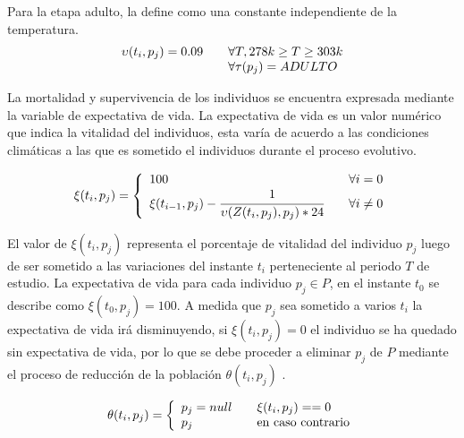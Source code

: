 Para la etapa adulto, \cite{otero2006stochastic} la define como una constante independiente de la temperatura.
\begin{equation}
 \begin{array}{l l}
    \upsilon(t_{i}, p_{j}) = 0.09 &\quad  \forall T, 278 k \geq T \geq 303 k\\
              & \quad \forall \tau(p_{j}) = ADULTO
\end{array}
\end{equation}

La mortalidad y supervivencia de los individuos se encuentra expresada mediante la variable de expectativa de
vida. La expectativa de vida es un valor numérico que indica la vitalidad del individuos, esta varía de acuerdo
a las condiciones climáticas a las que es sometido el individuos durante el proceso evolutivo.

\begin{equation}
\xi (t_{i}, p_{j}) = \left\{
  \begin{array}{l l}
    100 & \quad \forall i = 0 \\
    \xi (t_{i-1}, p_{j}) - \cfrac{1}{\upsilon(Z(t_{i}, p_{j}),p_{j}) * 24} & \quad \forall i \neq 0
  \end{array} \right.
\end{equation}

El valor de $\xi (t_{i}, p_{j})$ representa el porcentaje de vitalidad del
individuo $p_{j}$ luego de ser sometido a las variaciones del instante
$t_{i}$ perteneciente al periodo $T$ de estudio. La expectativa de vida
para cada individuo $p_{j} \in P$, en el instante $t_{0}$ se describe como
$\xi (t_{0}, p_{j})= 100$. A medida que $p_{j}$ sea sometido a varios
$t_{i}$ la expectativa de vida irá disminuyendo, si $\xi (t_{i}, p_{j})= 0$ el
individuo se ha quedado sin expectativa de vida, por lo que se debe proceder
a eliminar $p_{j}$ de $P$ mediante el proceso de reducción de la población
$\theta (t_{i}, p_{j})$ .

\begin{equation}
\theta (t_{i}, p_{j}) = \left\{
  \begin{array}{l l}
    p_{j} = null & \quad \xi(t_{i}, p_{j}) == 0 \\
    p_{j} & \quad \text{en caso contrario}
  \end{array} \right.
\end{equation}
